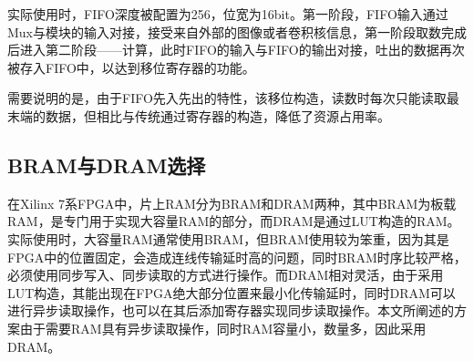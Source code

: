 实际使用时，FIFO深度被配置为256，位宽为16bit。第一阶段，FIFO输入通过Mux与模块的输入对接，接受来自外部的图像或者卷积核信息，第一阶段取数完成后进入第二阶段——计算，此时FIFO的输入与FIFO的输出对接，吐出的数据再次被存入FIFO中，以达到移位寄存器的功能。

需要说明的是，由于FIFO先入先出的特性，该移位构造，读数时每次只能读取最末端的数据，但相比与传统通过寄存器的构造，降低了资源占用率。

    \subsection{BRAM与DRAM选择}
    在Xilinx 7系FPGA中，片上RAM分为BRAM和DRAM两种，其中BRAM为板载RAM，是专门用于实现大容量RAM的部分，而DRAM是通过LUT构造的RAM。实际使用时，大容量RAM通常使用BRAM，但BRAM使用较为笨重，因为其是FPGA中的位置固定，会造成连线传输延时高的问题，同时BRAM时序比较严格，必须使用同步写入、同步读取的方式进行操作。而DRAM相对灵活，由于采用LUT构造，其能出现在FPGA绝大部分位置来最小化传输延时，同时DRAM可以进行异步读取操作，也可以在其后添加寄存器实现同步读取操作。本文所阐述的方案由于需要RAM具有异步读取操作，同时RAM容量小，数量多，因此采用DRAM。

